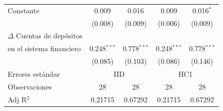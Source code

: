 \begin{tabular}{lcccc}
   Constante                                                     & 0.009                                                                   & 0.016                                                                             & 0.009                                                                   & 0.016$^{*}$\\   
                                                                & (0.008)                                                                 & (0.009)                                                                           & (0.006)                                                                 & (0.009)\\   
   $\Delta$ Cuentas de depósitos \\ en el sistema financiero    & 0.248$^{***}$                                                           & 0.778$^{***}$                                                                     & 0.248$^{***}$                                                           & 0.778$^{***}$\\   
                                                                & (0.085)                                                                 & (0.103)                                                                           & (0.086)                                                                 & (0.146)\\   
   \midrule
   Errores estándar & \multicolumn{2}{c}{IID} & \multicolumn{2}{c}{HC1} \\ 
   Observaciones                                                 & 28                                                                      & 28                                                                                & 28                                                                      & 28\\  
   Adj R$^2$                                               & 0.21715                                                                 & 0.67292                                                                           & 0.21715                                                                 & 0.67292\\  
   \midrule \midrule
\end{tabular}
\par\endgroup
